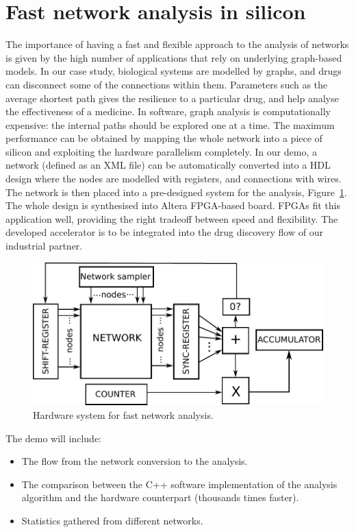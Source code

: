 \documentclass[conference]{IEEEtran}
\begin{document}
\section*{Fast network analysis in silicon}
The importance of having a fast and flexible approach to the analysis of networks is given by
the high number of applications that rely on underlying graph-based models. In our case study,
biological systems are modelled by graphs, and drugs can disconnect some of the connections
within them. Parameters such as the average shortest path gives the resilience to a particular
drug, and help analyse the effectiveness of a medicine. In software, graph analysis is
computationally expensive: the internal paths should be explored one at a time. 
The maximum performance can be obtained by mapping the whole network into a piece of silicon
and exploiting the hardware parallelism completely. In our demo, a network (defined as an XML
file) can be automatically converted into a HDL design where the nodes are modelled with
registers, and connections with wires. The network is then placed into a pre-designed system
for the analysis, Figure~\ref{fig:fantasi}. The whole design is synthesised into Altera
FPGA-based board. FPGAs fit this application well, providing the right tradeoff between speed
and flexibility. The developed accelerator is to be integrated into the drug discovery flow of
our industrial partner.

\begin{figure}[ht!]
\begin{center}
	\includegraphics[width=\linewidth]{FIG/fantasi+.pdf}
	\caption{Hardware system for fast network analysis.}
	\label{fig:fantasi}
\end{center}
\end{figure}
\noindent
The demo will include:
\begin{itemize}
\item The flow from the network conversion to the analysis.
\item The comparison between the C++ software implementation of the analysis algorithm and the
hardware counterpart (thousands times faster).
\item Statistics gathered from different networks.
\end{itemize}
\end{document}
